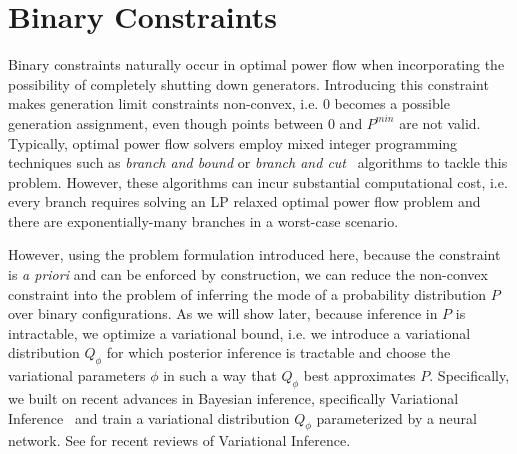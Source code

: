 \section{Binary Constraints}
\label{sec:bin_contraints}
Binary constraints naturally occur in optimal power flow when incorporating the possibility of completely shutting down generators. Introducing this constraint makes generation limit constraints non-convex, i.e. $0$ becomes a possible generation assignment, even though points between $0$ and $P^{min}$ are not valid. Typically, optimal power flow solvers employ mixed integer programming techniques such as \emph{branch and bound} or \emph{branch and cut}~\cite{lawler1966branch} algorithms to tackle this problem. However, these algorithms can incur substantial computational cost, i.e. every branch requires solving an LP relaxed optimal power flow problem and there are exponentially-many branches in a worst-case scenario.

However, using the problem formulation introduced here, because the constraint is \emph{a priori} and can be enforced by construction, we can reduce the non-convex constraint into the problem of inferring the mode of a probability distribution $P$ over binary configurations. As we will show later, because inference in $P$ is intractable, we optimize a variational bound, i.e. we introduce a variational distribution $Q_\phi$ for which posterior inference is tractable and choose the variational parameters $\phi$ in such a way that $Q_\phi$ best approximates $P$. Specifically, we built on recent advances in Bayesian inference, specifically Variational Inference~\cite{wainwright2008graphical} and train a variational distribution $Q_\phi$ parameterized by a neural network. See \cite{blei2017variational,zhang2017advances} for recent reviews of Variational Inference.

